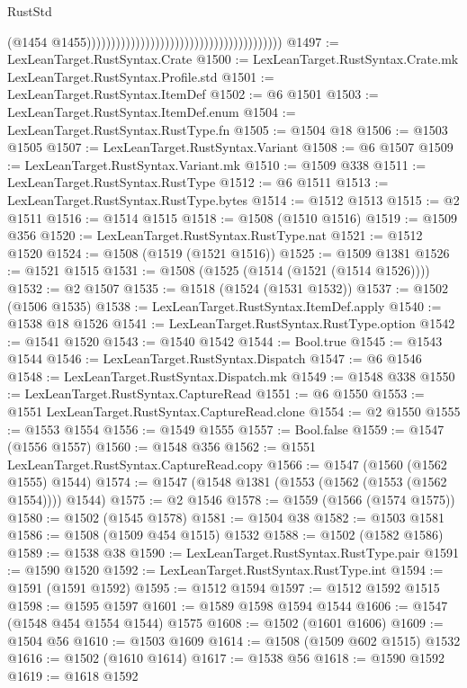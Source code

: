 \begin{lexlean}{RustStd}
\begin{coremodule}
                                                                                  (@1454
                                                                                    @1455))))))))))))))))))))))))))))))))))))))))
@1497 := LexLeanTarget.RustSyntax.Crate
@1500 := LexLeanTarget.RustSyntax.Crate.mk LexLeanTarget.RustSyntax.Profile.std
@1501 := LexLeanTarget.RustSyntax.ItemDef
@1502 := @6 @1501
@1503 := LexLeanTarget.RustSyntax.ItemDef.enum
@1504 := LexLeanTarget.RustSyntax.RustType.fn
@1505 := @1504 @18
@1506 := @1503 @1505
@1507 := LexLeanTarget.RustSyntax.Variant
@1508 := @6 @1507
@1509 := LexLeanTarget.RustSyntax.Variant.mk
@1510 := @1509 @338
@1511 := LexLeanTarget.RustSyntax.RustType
@1512 := @6 @1511
@1513 := LexLeanTarget.RustSyntax.RustType.bytes
@1514 := @1512 @1513
@1515 := @2 @1511
@1516 := @1514 @1515
@1518 := @1508 (@1510 @1516)
@1519 := @1509 @356
@1520 := LexLeanTarget.RustSyntax.RustType.nat
@1521 := @1512 @1520
@1524 := @1508 (@1519 (@1521 @1516))
@1525 := @1509 @1381
@1526 := @1521 @1515
@1531 := @1508 (@1525 (@1514 (@1521 (@1514 @1526))))
@1532 := @2 @1507
@1535 := @1518 (@1524 (@1531 @1532))
@1537 := @1502 (@1506 @1535)
@1538 := LexLeanTarget.RustSyntax.ItemDef.apply
@1540 := @1538 @18 @1526
@1541 := LexLeanTarget.RustSyntax.RustType.option
@1542 := @1541 @1520
@1543 := @1540 @1542
@1544 := Bool.true
@1545 := @1543 @1544
@1546 := LexLeanTarget.RustSyntax.Dispatch
@1547 := @6 @1546
@1548 := LexLeanTarget.RustSyntax.Dispatch.mk
@1549 := @1548 @338
@1550 := LexLeanTarget.RustSyntax.CaptureRead
@1551 := @6 @1550
@1553 := @1551 LexLeanTarget.RustSyntax.CaptureRead.clone
@1554 := @2 @1550
@1555 := @1553 @1554
@1556 := @1549 @1555
@1557 := Bool.false
@1559 := @1547 (@1556 @1557)
@1560 := @1548 @356
@1562 := @1551 LexLeanTarget.RustSyntax.CaptureRead.copy
@1566 := @1547 (@1560 (@1562 @1555) @1544)
@1574 := @1547 (@1548 @1381 (@1553 (@1562 (@1553 (@1562 @1554)))) @1544)
@1575 := @2 @1546
@1578 := @1559 (@1566 (@1574 @1575))
@1580 := @1502 (@1545 @1578)
@1581 := @1504 @38
@1582 := @1503 @1581
@1586 := @1508 (@1509 @454 @1515) @1532
@1588 := @1502 (@1582 @1586)
@1589 := @1538 @38
@1590 := LexLeanTarget.RustSyntax.RustType.pair
@1591 := @1590 @1520
@1592 := LexLeanTarget.RustSyntax.RustType.int
@1594 := @1591 (@1591 @1592)
@1595 := @1512 @1594
@1597 := @1512 @1592 @1515
@1598 := @1595 @1597
@1601 := @1589 @1598 @1594 @1544
@1606 := @1547 (@1548 @454 @1554 @1544) @1575
@1608 := @1502 (@1601 @1606)
@1609 := @1504 @56
@1610 := @1503 @1609
@1614 := @1508 (@1509 @602 @1515) @1532
@1616 := @1502 (@1610 @1614)
@1617 := @1538 @56
@1618 := @1590 @1592
@1619 := @1618 @1592

\end{coremodule}
\end{lexlean}
